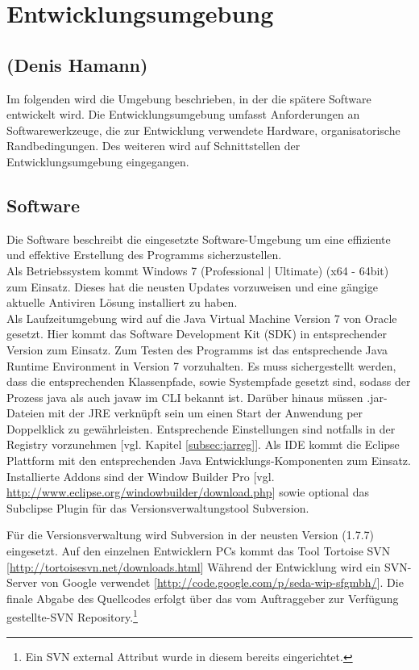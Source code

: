 \section{Entwicklungsumgebung}
\label{sec:Entwicklungsumgebung}

\subsection*{(Denis Hamann)}

Im folgenden wird die Umgebung beschrieben, in der die spätere Software entwickelt wird.
Die Entwicklungsumgebung umfasst Anforderungen an Softwarewerkzeuge, die zur Entwicklung verwendete Hardware, organisatorische
Randbedingungen. Des weiteren wird auf Schnittstellen der Entwicklungsumgebung eingegangen.

\subsection{Software}
\label{subsec:devsoftware}

Die Software beschreibt die eingesetzte Software-Umgebung um eine effiziente und effektive Erstellung des Programms sicherzustellen.\\

Als Betriebssystem kommt Windows 7 (Professional | Ultimate) (x64 - 64bit) zum Einsatz. Dieses hat die neusten Updates vorzuweisen und eine gängige aktuelle Antiviren Lösung installiert zu haben.\\

Als Laufzeitumgebung wird auf die Java Virtual Machine Version 7 von Oracle gesetzt. Hier kommt das Software Development Kit (SDK) in entsprechender Version zum Einsatz.
Zum Testen des Programms ist das entsprechende Java Runtime Environment in Version 7 vorzuhalten. Es muss sichergestellt werden, dass die entsprechenden Klassenpfade, sowie Systempfade gesetzt sind, sodass der Prozess java als auch javaw im CLI bekannt ist. Darüber hinaus müssen .jar-Dateien mit der JRE verknüpft sein um einen Start der Anwendung per Doppelklick zu gewährleisten. Entsprechende Einstellungen sind notfalls in der Registry vorzunehmen [vgl. Kapitel \ref{subsec:jarreg}].
Als IDE kommt die Eclipse Plattform mit den entsprechenden Java Entwicklungs-Komponenten zum Einsatz. Installierte Addons sind der Window Builder Pro [vgl. \url{http://www.eclipse.org/windowbuilder/download.php}] sowie optional das Subclipse Plugin für das Versionsverwaltungstool Subversion.

Für die Versionsverwaltung wird Subversion in der neusten Version (1.7.7) eingesetzt. Auf den einzelnen Entwicklern PCs kommt das Tool Tortoise SVN [\url{http://tortoisesvn.net/downloads.html}]
Während der Entwicklung wird ein SVN-Server von Google verwendet [\url{http://code.google.com/p/seda-wip-sfgmbh/}]. Die finale Abgabe des Quellcodes erfolgt über das vom Auftraggeber zur Verfügung gestellte-SVN Repository.\footnote{Ein SVN external Attribut wurde in diesem bereits eingerichtet.}\\


